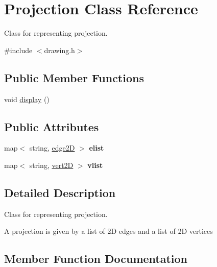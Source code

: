 \hypertarget{class_projection}{}\section{Projection Class Reference}
\label{class_projection}


Class for representing projection.  




{\ttfamily \#include $<$drawing.\+h$>$}

\subsection*{Public Member Functions}
\begin{DoxyCompactItemize}
\item 
void \mbox{\hyperlink{class_projection_a64871b1bca81515ba173648cdad3a554}{display}} ()
\end{DoxyCompactItemize}
\subsection*{Public Attributes}
\begin{DoxyCompactItemize}
\item 
\mbox{\label{class_projection_a01b6134fd498b88448a8ae68caf9fe16}} 
map$<$ string, \mbox{\hyperlink{structedge2_d}{edge2D}} $>$ {\bfseries elist}
\item 
\mbox{\label{class_projection_abef70fe91cb06a2f43cf6337bd10f552}} 
map$<$ string, \mbox{\hyperlink{structvert2_d}{vert2D}} $>$ {\bfseries vlist}
\end{DoxyCompactItemize}


\subsection{Detailed Description}
Class for representing projection. 

A projection is given by a list of 2D edges and a list of 2D vertices 

\subsection{Member Function Documentation}
\mbox{\label{class_projection_a64871b1bca81515ba173648cdad3a554}} 
